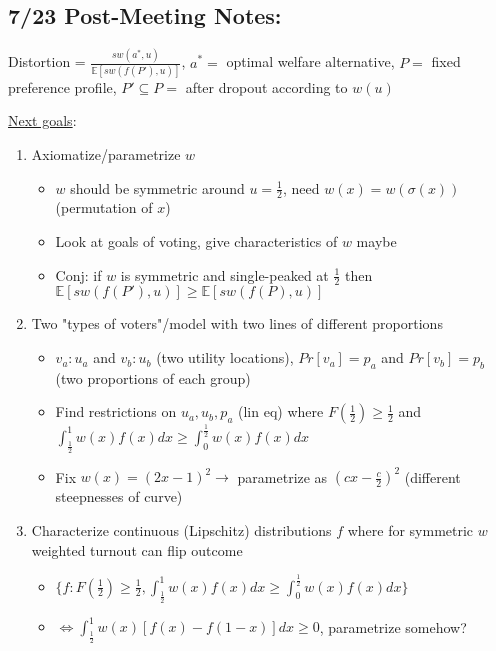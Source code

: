 \documentclass[12pt]{article}
\begin{document}
\subsection*{7/23 Post-Meeting Notes:}

Distortion = $\frac{sw(a^*, u)}{\mathbb{E}[sw(f(P'), u)]}$, $a^* =$ optimal welfare alternative, $P =$ fixed preference profile, $P' \subseteq P =$ after dropout according to $w(u)$

\underline{Next goals}:
\begin{enumerate}[nolistsep]
    \item Axiomatize/parametrize $w$
    \begin{itemize}[nolistsep]
        \item $w$ should be symmetric around $u = \frac{1}{2}$, need $w(x) = w(\sigma(x))$ (permutation of $x$)
        \item Look at goals of voting, give characteristics of $w$ maybe
        \item Conj: if $w$ is symmetric and single-peaked at $\frac{1}{2}$ then $\mathbb{E}[sw(f(P'), u)] \geq \mathbb{E}[sw(f(P), u)]$
    \end{itemize}
    \item Two "types of voters"/model with two lines of different proportions
    \begin{itemize}[nolistsep]
        \item $v_a : u_a$ and $v_b : u_b$ (two utility locations), $Pr[v_a] = p_a$ and $Pr[v_b] = p_b$ (two proportions of each group)
        \item Find restrictions on $u_a, u_b, p_a$ (lin eq) where $F(\frac{1}{2}) \geq \frac{1}{2}$ and $\int_\frac{1}{2}^1w(x)f(x)dx \geq \int_0^\frac{1}{2}w(x)f(x)dx$
        \item Fix $w(x) = (2x-1)^2 \rightarrow$ parametrize as $(cx-\frac{c}{2})^2$ (different steepnesses of curve)
    \end{itemize}
    \item Characterize continuous (Lipschitz) distributions $f$ where for symmetric $w$ weighted turnout can flip outcome
    \begin{itemize}[nolistsep]
        \item $\{f: F(\frac{1}{2}) \geq \frac{1}{2}, \int_\frac{1}{2}^1w(x)f(x)dx \geq \int_0^\frac{1}{2}w(x)f(x)dx\}$
        \item $\iff \int_\frac{1}{2}^1w(x)[f(x)-f(1-x)]dx \geq 0$, parametrize somehow?
    \end{itemize}
\end{enumerate}
\end{document}
